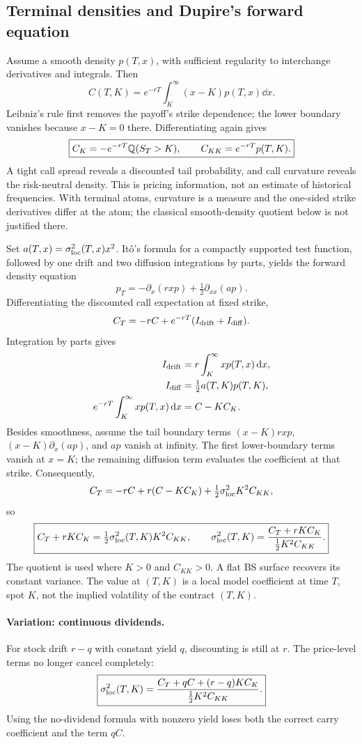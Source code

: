 \subsection{Terminal densities and Dupire's forward equation}
Assume a smooth density \(p(T,x)\), with sufficient regularity to
interchange derivatives and integrals. Then
\[
C(T,K)=e^{-rT}\int_K^\infty(x-K)p(T,x)\dd x.
\]
Leibniz's rule first removes the payoff's strike dependence; the lower
boundary vanishes because \(x-K=0\) there. Differentiating again gives
\[
\boxed{C_K=-e^{-rT}\mathbb{Q}(S_T>K),\qquad C_{KK}=e^{-rT}p(T,K).}
\]
A tight call spread reveals a discounted tail probability, and call
curvature reveals the risk-neutral density. This is pricing information,
not an estimate of historical frequencies. With terminal atoms, curvature
is a measure and the one-sided strike derivatives differ at the atom;
the classical smooth-density quotient below is not justified there.

Set \(a(T,x)=\sigma_{\rm loc}^2(T,x)x^2\). It\^o's formula for a compactly
supported test function, followed by one drift and two diffusion
integrations by parts, yields the forward density equation
\[
p_T=-\partial_x(rxp)+\tfrac12\partial_{xx}(ap).
\]
Differentiating the discounted call expectation at fixed strike,
\[
C_T=-rC+e^{-rT}(I_{\rm drift}+I_{\rm diff}).
\]
Integration by parts gives
\[
\begin{aligned}
I_{\rm drift}&=r\int_K^\infty xp(T,x)\,\mathrm{d} x,\\
I_{\rm diff}&=\tfrac12a(T,K)p(T,K),\\
e^{-rT}\int_K^\infty xp(T,x)\,\mathrm{d} x&=C-KC_K.
\end{aligned}
\]
Besides smoothness, assume the tail boundary terms
\((x-K)rxp\), \((x-K)\partial_x(ap)\), and \(ap\) vanish at infinity.
The first lower-boundary terms vanish at \(x=K\); the remaining diffusion
term evaluates the coefficient at that strike. Consequently,
\[
C_T=-rC+r(C-KC_K)+\tfrac12\sigma_{\rm loc}^2K^2C_{KK},
\]
so
\[
\boxed{C_T+rKC_K=\tfrac12\sigma_{\rm loc}^2(T,K)K^2C_{KK},\qquad
\sigma_{\rm loc}^2(T,K)=\frac{C_T+rKC_K}{\tfrac12K^2C_{KK}}.}
\]
The quotient is used where \(K>0\) and \(C_{KK}>0\). A flat BS surface
recovers its constant variance. The value at \((T,K)\) is a local model
coefficient at time \(T\), spot \(K\), not the implied volatility of the
contract \((T,K)\).

\paragraph{Variation: continuous dividends.}
For stock drift \(r-q\) with constant yield \(q\), discounting is still
at \(r\). The price-level terms no longer cancel completely:
\[
\boxed{\sigma_{\rm loc}^2(T,K)
=\frac{C_T+qC+(r-q)KC_K}{\tfrac12K^2C_{KK}}.}
\]
Using the no-dividend formula with nonzero yield loses both the correct
carry coefficient and the term \(qC\).

